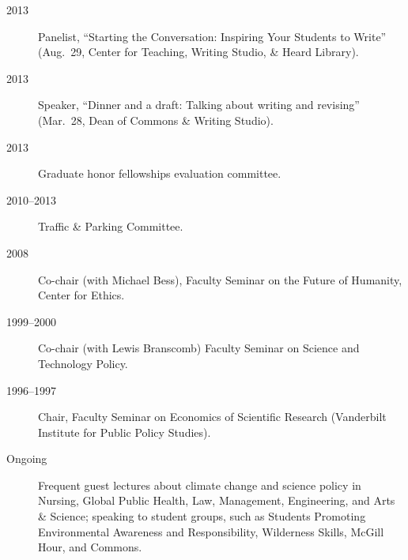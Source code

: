 \documentclass[10pt]{article}
\begin{document}
\begin{description}
            \item[2013] Panelist, ``Starting the Conversation: Inspiring Your Students to Write'' (Aug.~29, Center for Teaching, Writing Studio, \& Heard Library).
            \item[2013] Speaker, ``Dinner and a draft: Talking about writing and revising'' (Mar.~28, Dean of Commons \& Writing Studio).
            \item[2013] Graduate honor fellowships evaluation committee.
            \item[2010--2013] Traffic \& Parking Committee.
            \item[2008] Co-chair (with Michael Bess), Faculty Seminar on the Future of Humanity, Center for Ethics.
            \item[1999--2000] Co-chair (with Lewis Branscomb) Faculty Seminar on Science and Technology Policy.
            \item[1996--1997] Chair, Faculty Seminar on Economics of Scientific Research (Vanderbilt Institute for Public Policy Studies).
            \item[Ongoing] Frequent guest lectures about climate change and science policy in Nursing, Global Public Health, Law, Management, Engineering, and Arts \& Science; speaking to student groups, such as Students Promoting Environmental Awareness and Responsibility, Wilderness Skills, McGill Hour, and Commons.
        \end{description}
\fi
\end{document}
